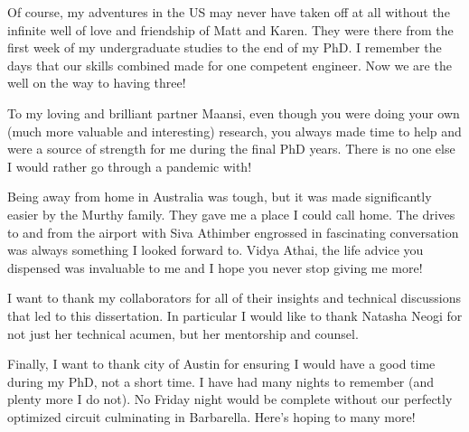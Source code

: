 \documentclass[12pt]{report}	%
\theoremstyle{definition}
\theoremstyle{remark}
\begin{document}
\begin{acknowledgments}
Of course, my adventures in the US may never have taken off at all without the infinite well of love and friendship of Matt and Karen. They were there from the first week of my undergraduate studies to the end of my PhD. I remember the days that our skills combined made for one competent engineer. Now we are the well on the way to having three!

To my loving and brilliant partner Maansi, even though you were doing your own (much more valuable and interesting) research, you always made time to help and were a source of strength for me during the final PhD years. There is no one else I would rather go through a pandemic with! 

Being away from home in Australia was tough, but it was made significantly easier by the Murthy family. They gave me a place I could call home. The drives to and from the airport with Siva Athimber engrossed in fascinating conversation was always something I looked forward to. Vidya Athai, the life advice you dispensed was invaluable to me and I hope you never stop giving me more! 

I want to thank my collaborators for all of their insights and technical discussions that led to this dissertation. In particular I would like to thank Natasha Neogi for not just her technical acumen, but her mentorship and counsel. 

Finally, I want to thank city of Austin for ensuring I would have a good time during my PhD, not a short time. I have had many nights to remember (and plenty more I do not). No Friday night would be complete without our perfectly optimized circuit culminating in Barbarella. Here's hoping to many more!
 
\end{acknowledgments}


%
\utabstract
{}%
\indent
\end{document}
